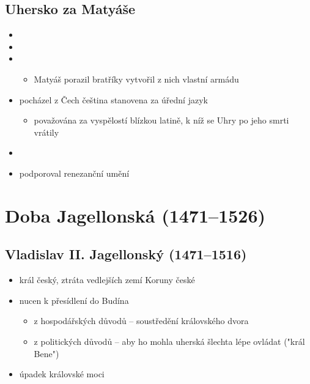 \subsection{Uhersko za Matyáše}
\begin{itemize}
\item {}
\item {}
\item {}
	\begin{itemize}
	\item Matyáš porazil bratříky \ra vytvořil z nich vlastní armádu
	\end{itemize}
\item pocházel z Čech \ra čeština stanovena za úřední jazyk
	\begin{itemize}
	\item považována za vyspělostí blízkou latině, k níž se Uhry po jeho smrti vrátily
	\end{itemize}
\item {}
\item podporoval renezanční umění
\end{itemize}



\section{Doba Jagellonská (1471--1526)}
\subsection{Vladislav II. Jagellonský (1471--1516)}
\begin{itemize}
\item král český, ztráta vedlejších zemí Koruny české
\item {} \ra nucen k přesídlení do Budína
	\begin{itemize}
	\item z hospodářských důvodů -- soustředění královského dvora
	\item z politických důvodů -- aby ho mohla uherská šlechta lépe ovládat ("král Bene")
	\end{itemize}
\item[\ra] úpadek královské moci
\end{itemize}

